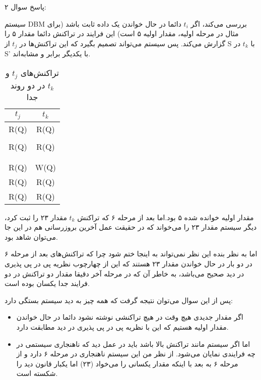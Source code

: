 \documentclass[a4paper]{article}
\begin{document}
\newpage

پاسخ سوال ۲:

سیستم DBM بررسی می‌کند، اگر $t_{i}$ دائما در حال خواندن یک داده ثابت باشد (برای
مثال در مرحله اولیه، مقدار اولیه ۵ است) این فرایند در تراکنش  دائما مقدار ۵ را گزارش می‌کند. پس سیستم می‌تواند تصمیم بگیرد که این
تراکنش‌ها در $t_{j}$ از S با $t_{k}$ در S' با یکدیگر برابر و مشابه‌اند.


\begin{LTR}
    \begin{table}[h]
        \centering
        \begin{RTL}
            \caption{تراکنش‌های $t_{j}$ و $t_{k}$ در دو روند جدا}
        \end{RTL}
        \begin{tabular}{|c|c|}
            \hline
            $t_{j}$ & $t_{k}$ \\ \hline
            R(Q) & R(Q) \\ \hline
            & \\ \hline
            R(Q) & R(Q) \\ \hline
            & \\ \hline
            & \\ \hline
            R(Q) & W(Q) \\ \hline
            R(Q) & R(Q) \\ \hline
            R(Q) & R(Q) \\ \hline
        \end{tabular}
    \end{table}
\end{LTR}

مقدار اولیه خوانده شده ۵ بود.اما بعد از مرحله ۶ که تراکنش $t_{k}$ مقدار ۲۳ را
ثبت کرد، دیگر سیستم مقدار ۲۳ را می‌خواند که در حقیقت عمل آخرین بروزرسانی هم در
این جا می‌توان شاهد بود.


اما به نظر بنده این نظر نمی‌تواند به اینجا ختم شود چرا که تراکنش‌های بعد از
مرحله ۶ در دو بار در حال خواندن مقدار ۲۳ هستند که این از چهارچوب نظریه پی در پی
پذیری در دید صحیح می‌باشد، به خاطر آن که در مرحله آخر دقیقا مقدار دو تراکنش در
دو فرایند جدا یکسان بوده است.

پس از این سوال می‌توان نتیجه گرفت که همه چیز به دید سیستم بستگی دارد:

\begin{itemize}
    \item اگر مقدار جدیدی هیچ وقت در هیچ تراکنشی نوشته نشود دائما در حال خواندن
    مقدار اولیه هستیم که این با نظریه پی در پی پذیری در دید مطابقت دارد.
    \item اما اگر سیستم مانند تراکنش بالا باشد باید در عمل دید که ناهنجاری
    سیستمی در چه فرایندی نمایان می‌شود. از نظر من این سیستم ناهنجاری در مرحله ۶
    دارد و از مرحله ۶ به بعد با اینکه مقدار یکسانی را می‌خواد (۲۳) اما یکبار
    قانون دید را شکسته است.
\end{itemize}
\end{document}
